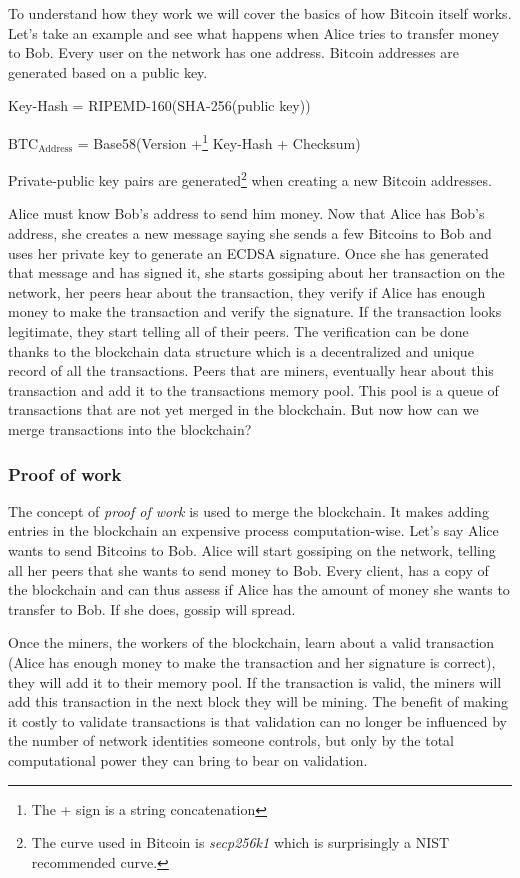\documentclass{vldb}
\begin{document}
To understand how they work we will cover the basics of how Bitcoin itself works. Let's take an example and see what happens when Alice tries to transfer money to Bob. Every user on the network has one address. Bitcoin addresses\cite{bitcoinSpec} are generated based on a public key. 
\begin{center}

Key-Hash = RIPEMD-160(SHA-256(public key))

$\text{BTC}_{\text{Address}}$ = Base58(Version +\footnote{The + sign is a string concatenation} Key-Hash + Checksum)
\end{center}

Private-public key pairs are generated\footnote{The curve used in Bitcoin is \emph{secp256k1} which is surprisingly a NIST recommended curve.} when creating a new Bitcoin addresses.

Alice must know Bob's address to send him money. Now that Alice has Bob's address, she creates a new message saying she sends a few Bitcoins to Bob and uses her private key to generate an ECDSA signature. Once she has generated that message and has signed it, she starts gossiping about her transaction on the network, her peers hear about the transaction, they verify if Alice has enough money to make the transaction and verify the signature. If the transaction looks legitimate, they start telling all of their peers. The verification can be done thanks to the blockchain data structure which is a decentralized and unique record of all the transactions. Peers that are miners, eventually hear about this transaction and add it to the transactions memory pool. This pool is a queue of transactions that are not yet merged in the blockchain. But now how can we merge transactions into the blockchain? 

\subsubsection{Proof of work}

The concept of \emph{proof of work} is used to merge the blockchain. It makes adding entries in the blockchain an expensive process computation-wise. Let's say Alice wants to send Bitcoins to Bob. Alice will start gossiping on the network, telling all her peers that she wants to send money to Bob. Every client, has a copy of the blockchain and can thus assess if Alice has the amount of money she wants to transfer to Bob. If she does, gossip will spread.

Once the miners, the workers of the blockchain, learn about a valid transaction (Alice has enough money to make the transaction and her signature is correct), they will add it to their memory pool. If the transaction is valid, the miners will add this transaction in the next block they will be mining. The benefit of making it costly to validate transactions is that validation can no longer be influenced by the number of network identities someone controls, but only by the total computational power they can bring to bear on validation.
\end{document}
